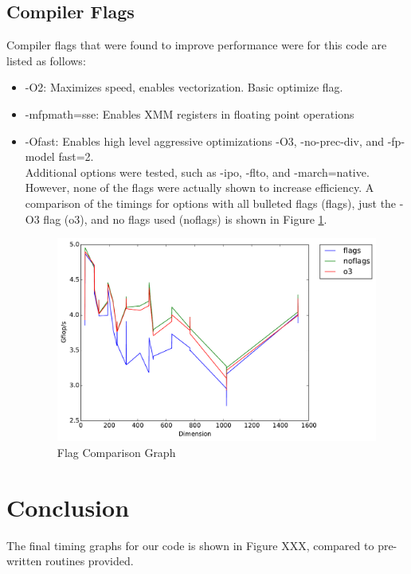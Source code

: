 \documentclass[letterpaper]{article}	 %
\begin{document}
\subsection{Compiler Flags}
Compiler flags that were found to improve performance were for this code are listed as follows: \\
\begin{itemize}
\item -O2: Maximizes speed, enables vectorization. Basic optimize flag. 
\item -mfpmath=sse: Enables XMM registers in floating point operations
\item -Ofast: Enables high level aggressive optimizations -O3, -no-prec-div, and -fp-model fast=2. 
\\ 

Additional options were tested, such as -ipo, -flto, and -march=native. However, none of the flags were actually shown to increase efficiency. A comparison of the timings for options with all bulleted flags (flags), just the -O3 flag (o3), and no flags used (noflags) is shown in Figure \ref{fig:flags}. 

\begin{figure}[H]
\centering
  \centering
  \includegraphics[width=.6\linewidth]{timing_flagcompare.pdf}
  \caption{Flag Comparison Graph}
  \label{fig:flags}
  \end{figure}

\end{itemize}

\section{Conclusion}

The final timing graphs for our code is shown in Figure XXX, compared to pre-written routines provided.

\end{document}

